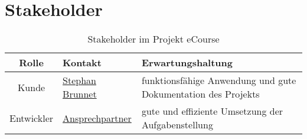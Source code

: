 \section{Stakeholder}

\begin{table}[H]
\centering
\begin{tabularx}{\textwidth}[H]{|c|X|X|}
\hline
Rolle &	Kontakt & Erwartungshaltung\\
\hline
Kunde & \href{mailto:Stephan.Brunnet@softwareinmotion.de}{Stephan Brunnet}  & funktionsfähige Anwendung und gute Dokumentation des Projekts \\
\hline
Entwickler & \href{mailto:inf19109@lehre.dhbw-stuttgart.de}{Ansprechpartner} & gute und effiziente Umsetzung der Aufgabenstellung\\
\hline
\end{tabularx}
\caption{Stakeholder im Projekt eCourse}
\label{tab:Stakeholder}
\end{table}


